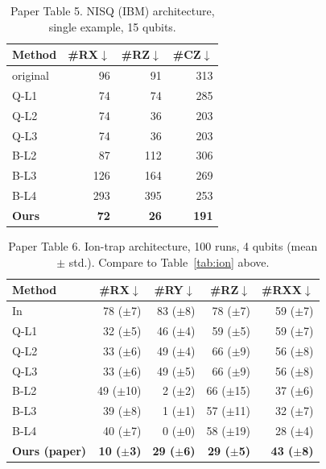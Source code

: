 \documentclass[11pt,a4paper]{article}
\begin{document}
\begin{table}[H]
\centering
\caption{Paper Table 5. NISQ (IBM) architecture, single example, 15 qubits.}
\begin{tabular}{lrrr}
\toprule
Method & \#RX$\downarrow$ & \#RZ$\downarrow$ & \#CZ$\downarrow$ \\
\midrule
original & 96 & 91 & 313 \\
Q-L1 & 74 & 74 & 285 \\
Q-L2 & 74 & 36 & 203 \\
Q-L3 & 74 & 36 & 203 \\
B-L2 & 87 & 112 & 306 \\
B-L3 & 126 & 164 & 269 \\
B-L4 & 293 & 395 & 253 \\
\textbf{Ours} & \textbf{72} & \textbf{26} & \textbf{191} \\
\bottomrule
\end{tabular}
\end{table}

\begin{table}[H]
\centering
\caption{Paper Table 6. Ion-trap architecture, 100 runs, 4 qubits
(mean $\pm$ std.). Compare to Table~\ref{tab:ion} above.}
\begin{tabular}{lrrrr}
\toprule
Method & \#RX$\downarrow$ & \#RY$\downarrow$ & \#RZ$\downarrow$ & \#RXX$\downarrow$ \\
\midrule
In & 78 ($\pm$7) & 83 ($\pm$8) & 78 ($\pm$7) & 59 ($\pm$7) \\
Q-L1 & 32 ($\pm$5) & 46 ($\pm$4) & 59 ($\pm$5) & 59 ($\pm$7) \\
Q-L2 & 33 ($\pm$6) & 49 ($\pm$4) & 66 ($\pm$9) & 56 ($\pm$8) \\
Q-L3 & 33 ($\pm$6) & 49 ($\pm$5) & 66 ($\pm$9) & 56 ($\pm$8) \\
B-L2 & 49 ($\pm$10) & 2 ($\pm$2) & 66 ($\pm$15) & 37 ($\pm$6) \\
B-L3 & 39 ($\pm$8) & 1 ($\pm$1) & 57 ($\pm$11) & 32 ($\pm$7) \\
B-L4 & 40 ($\pm$7) & 0 ($\pm$0) & 58 ($\pm$19) & 28 ($\pm$4) \\
\textbf{Ours (paper)} & \textbf{10 ($\pm$3)} & \textbf{29 ($\pm$6)} & \textbf{29 ($\pm$5)} & \textbf{43 ($\pm$8)} \\
\bottomrule
\end{tabular}
\end{table}
\end{document}
